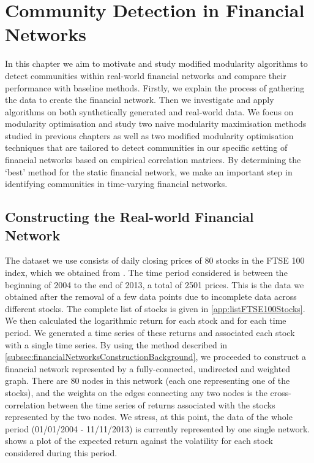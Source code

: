 
\chapter{Community Detection in Financial Networks}

\label{cha:communityDetectionFinancialNetworks}


In this chapter we aim to motivate and study modified modularity algorithms to detect communities within real-world financial networks and compare their performance with baseline methods.
Firstly, we explain the process of gathering the data to create the financial network.
Then we investigate and apply algorithms on both synthetically generated and real-world data.
We focus on modularity optimisation and study two naive modularity maximisation methods studied in previous chapters as well as two modified modularity optimisation techniques that are tailored to detect communities in our specific setting of financial networks based on empirical correlation matrices.
By determining the `best' method for the static financial network, we make an important step in identifying communities in time-varying financial networks.


\section{Constructing the Real-world Financial Network}
\label{sec:realWorldFinancialNetwork}

The dataset we use consists of daily closing prices of 80 stocks in the FTSE 100 index, which we obtained from \cite{LSE,YahFi}.
The time period considered is between the beginning of 2004 to the end of 2013, a total of 2501 prices. 
This is the data we obtained after the removal of a few data points due to incomplete data across different stocks.
The complete list of stocks is given in \cref{app:listFTSE100Stocks}.
We then calculated the logarithmic return for each stock and for each time period.
We generated a time series of these returns and associated each stock with a single time series.
By using the method described in \cref{subsec:financialNetworksConstructionBackground}, we proceeded to construct a financial network represented by a fully-connected, undirected and weighted graph.
There are 80 nodes in this network (each one representing one of the stocks), and the weights on the edges connecting any two nodes is the cross-correlation between the time series of returns associated with the stocks represented by the two nodes.
We stress, at this point, the data of the whole period (01/01/2004 - 11/11/2013) is currently represented by one single network.
 shows a plot of the expected return against the volatility for each stock considered during this period.

